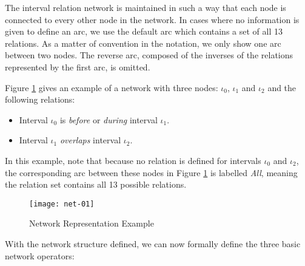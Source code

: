 \documentclass[11pt]{report}
\begin{document}
          The interval relation network is maintained in such a way that each
          node is connected to every other node in the network. In cases where
          no information is given to define an arc, we use the default arc
          which  contains a set of all 13 relations. As a matter of convention
          in the notation, we only show one arc between two nodes. The reverse
          arc, composed of the inverses of the relations represented by the
          first arc, is omitted.

          Figure \ref{figu-tempo-ntwk1} gives an example of a network with
          three nodes: $\iota_0$, $\iota_1$ and $\iota_2$ and the following
          relations:

          \begin{itemize}
            \item
              Interval $\iota_0$ is {\em before} or {\em during} interval
              $\iota_1$.
            \item
              Interval $\iota_1$ {\em overlaps} interval $\iota_2$.
          \end{itemize}

          In this example, note that because no relation is defined for
          intervals $\iota_0$ and $\iota_2$, the corresponding arc between
          these nodes in Figure \ref{figu-tempo-ntwk1} is labelled {\em All},
          meaning the relation set contains all 13 possible relations.

          \begin{figure}[tbhp]
            \begin{center}
              \texttt{[image: net-01]}
              \caption{Network Representation Example}
              \label{figu-tempo-ntwk1}
            \end{center}
          \end{figure}

          With the network structure defined, we can now formally define the
          three basic network operators:
\end{document}
